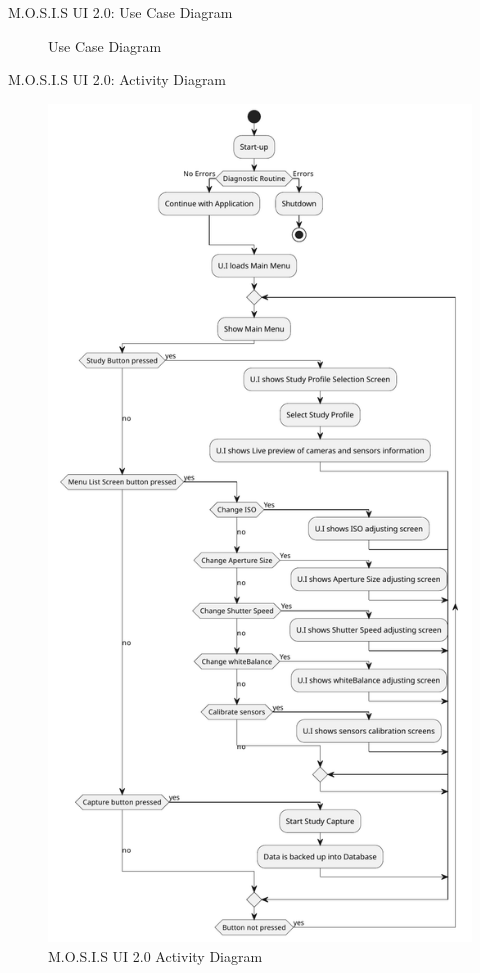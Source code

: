 \documentclass[17pt, aspectratio=169]{beamer}
\begin{document}
\begin{frame}{M.O.S.I.S UI 2.0: Use Case Diagram}

	\begin{figure}
		\caption{Use Case Diagram}
	\end{figure}
\end{frame}
\begin{frame}{M.O.S.I.S UI 2.0: Activity Diagram}
	\begin{figure}[H]
		\includegraphics[page=1,height=0.65\textheight]{../../Progress_Report_Document/Appendix/Design_Documentation/Activity_Diagram/Figures/activity.pdf}
		\caption{M.O.S.I.S UI 2.0 Activity Diagram}
	\end{figure}

\end{frame}
\end{document}
